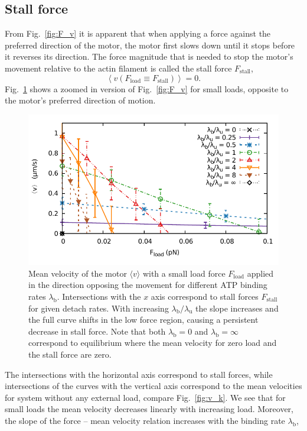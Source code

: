\documentclass[aps,pre,twocolumn,showpacs,showkeys,superscriptaddress,floatfix]{revtex4-1}
\begin{document}
\subsection{Stall force}
From Fig.~\ref{fig:F_v} it is apparent that when applying a force against the preferred direction of the motor, 
the motor first slows down until it stops before it reverses its direction. 
The force magnitude that is needed to stop the motor's movement relative to the actin filament is called the stall force $F_\text{stall}$,  
\[
\left\langle v ( F_\text{load} \equiv F_\text{stall} ) \right\rangle = 0 .
\]
Fig.~\ref{fig:F_v_zoom} shows a zoomed in version of Fig.~\ref{fig:F_v} for small loads, opposite to the motor's preferred direction of motion. 
\begin{figure}[t]
\centering
\includegraphics[width=0.9\linewidth,height=!]{F_v_zoom}
\caption{
\label{fig:F_v_zoom} 
Mean velocity of the motor $\langle v \rangle$ with a small load force $F_\text{load}$ applied in the direction opposing the movement for different ATP binding rates $\lambda_\text{b}$.
Intersections with the $x$ axis correspond to stall forces $F_\text{stall}$ for given detach rates. 
With increasing $\lambda_\text{b}/\lambda_\text{u}$  the slope increases and the full curve shifts in the low force region, 
causing a persistent decrease in stall force. 
Note that both $\lambda_\text{b} = 0 $ and $\lambda_\text{b} = \infty$ correspond to equilibrium where the mean velocity for zero load and the stall force are zero. 
}
\end{figure}
The intersections with the horizontal axis correspond to stall forces,  
while intersections of the curves with the vertical axis correspond to the mean velocities for system without any external load, compare Fig.~\ref{fig:v_k}. 
We see that for small loads the mean velocity decreases linearly with increasing load. 
Moreover, the slope of the force -- mean velocity relation increases with the binding rate $\lambda_\text{b}$,
\end{document}
